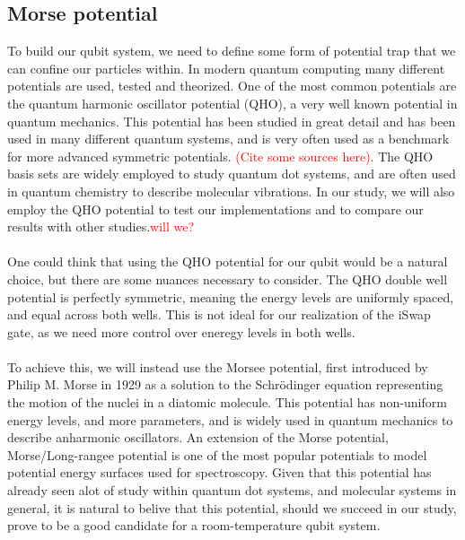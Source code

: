 \documentclass{subfiles}
\begin{document}
\subsection*{Morse potential}\label{sec:morse_potential}
To build our qubit system, we need to define some form of potential trap that we can confine our particles within. In modern quantum computing many different potentials are used, tested and theorized. One of the most common potentials are the quantum harmonic oscillator potential (QHO), a very well known potential in quantum mechanics. This potential has been studied in great detail and has been used in many different quantum systems, and is very often used as a benchmark for more advanced symmetric potentials. \textcolor{red}{(Cite some sources here)}. The QHO basis sets are widely employed to study quantum dot systems\cite{Yuan_2017}, and are often used in quantum chemistry to describe molecular vibrations. In our study, we will also employ the QHO potential to test our implementations and to compare our results with other studies.\textcolor{red}{will we?}
\\ \\ One could think that using the QHO potential for our qubit would be a natural choice, but there are some nuances necessary to consider. The QHO double well potential is perfectly symmetric, meaning the energy levels are uniformly spaced, and equal across both wells. This is not ideal for our realization of the iSwap gate, as we need more control over eneregy levels in both wells. \\ \\ To achieve this, we will instead use the Morsee potential, first introduced by Philip M. Morse in 1929 as a solution to the Schrödinger equation representing the motion of the nuclei in a diatomic molecule\cite{morse1929diatomic}. This potential has non-uniform energy levels, and more parameters, and is widely used in quantum mechanics to describe anharmonic oscillators. An extension of the Morse potential, Morse/Long-rangee potential is one of the most popular potentials to model potential energy surfaces used for spectroscopy\cite{zhai2018constructing}. Given that this potential has already seen alot of study within quantum dot systems, and molecular systems in general, it is natural to belive that this potential, should we succeed in our study, prove to be a good candidate for a room-temperature qubit system. \\ \\ 
\end{document}
